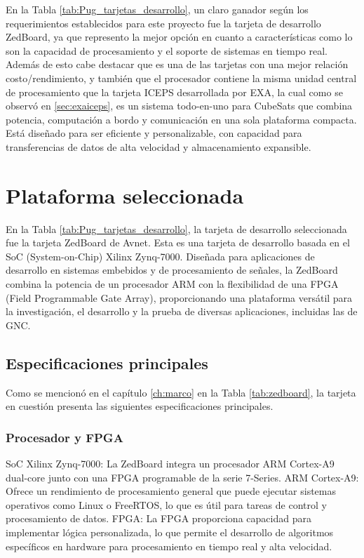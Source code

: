En la Tabla \ref{tab:Pug_tarjetas_desarrollo}, un claro ganador según los requerimientos establecidos para este proyecto fue la tarjeta de desarrollo ZedBoard, ya que represento la mejor opción en cuanto a características como lo son la capacidad de procesamiento y el soporte de sistemas en tiempo real. Además de esto cabe destacar que es una de las tarjetas con una mejor relación costo/rendimiento, y también que el procesador contiene la misma unidad central de procesamiento que la tarjeta ICEPS desarrollada por EXA, la cual como se observó en \ref{sec:exaiceps}, es un sistema todo-en-uno para CubeSats que combina potencia, computación a bordo y comunicación en una sola plataforma compacta. Está diseñado para ser eficiente y personalizable, con capacidad para transferencias de datos de alta velocidad y almacenamiento expansible.

\section{Plataforma seleccionada}

En la Tabla \ref{tab:Pug_tarjetas_desarrollo}, la tarjeta de desarrollo seleccionada fue la tarjeta ZedBoard de Avnet. Esta es una tarjeta de desarrollo basada en el SoC (System-on-Chip) Xilinx Zynq-7000. Diseñada para aplicaciones de desarrollo en sistemas embebidos y de procesamiento de señales, la ZedBoard combina la potencia de un procesador ARM con la flexibilidad de una FPGA (Field Programmable Gate Array), proporcionando una plataforma versátil para la investigación, el desarrollo y la prueba de diversas aplicaciones, incluidas las de GNC.

\subsection{Especificaciones principales}

Como se mencionó en el capítulo \ref{ch:marco} en la Tabla \ref{tab:zedboard}, la tarjeta en cuestión presenta las siguientes especificaciones principales.

\subsubsection{Procesador y FPGA}
SoC Xilinx Zynq-7000: La ZedBoard integra un procesador ARM Cortex-A9 dual-core junto con una FPGA programable de la serie 7-Series.
ARM Cortex-A9: Ofrece un rendimiento de procesamiento general que puede ejecutar sistemas operativos como Linux o FreeRTOS, lo que es útil para tareas de control y procesamiento de datos.
FPGA: La FPGA proporciona capacidad para implementar lógica personalizada, lo que permite el desarrollo de algoritmos específicos en hardware para procesamiento en tiempo real y alta velocidad.
